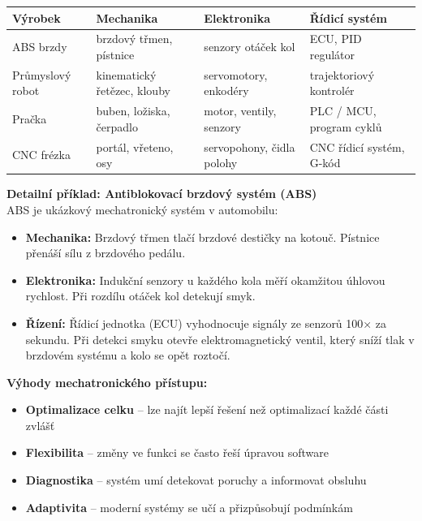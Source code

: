 \documentclass[a4paper,10pt]{article}
\begin{document}
\begin{vysvetlenibox}
\begin{center}
\begin{tabularx}{0.95\linewidth}{@{} l X X X @{}}
    \toprule
    \textbf{Výrobek} & \textbf{Mechanika} & \textbf{Elektronika}
                     & \textbf{Řídicí systém} \\
    \midrule
    ABS brzdy        & brzdový třmen, pístnice & senzory otáček kol
                     & ECU, PID regulátor \\
    Průmyslový robot & kinematický řetězec, klouby & servomotory, enkodéry
                     & trajektoriový kontrolér \\
    Pračka           & buben, ložiska, čerpadlo & motor, ventily, senzory
                     & PLC / MCU, program cyklů \\
    CNC frézka       & portál, vřeteno, osy & servopohony, čidla polohy
                     & CNC řídicí systém, G-kód \\
    \bottomrule
\end{tabularx}
\end{center}

\textbf{Detailní příklad: Antiblokovací brzdový systém (ABS)}\\
ABS je ukázkový mechatronický systém v automobilu:
\begin{itemize}[noitemsep, leftmargin=1.4em, topsep=4pt]
    \item \textbf{Mechanika:} Brzdový třmen tlačí brzdové destičky na kotouč.
          Pístnice přenáší sílu z brzdového pedálu.
    \item \textbf{Elektronika:} Indukční senzory u každého kola měří okamžitou
          úhlovou rychlost. Při rozdílu otáček kol detekují smyk.
    \item \textbf{Řízení:} Řídicí jednotka (ECU) vyhodnocuje signály ze senzorů
          100× za sekundu. Při detekci smyku otevře elektromagnetický ventil,
          který sníží tlak v brzdovém systému a kolo se opět roztočí.
\end{itemize}

\textbf{Výhody mechatronického přístupu:}
\begin{itemize}[noitemsep, leftmargin=1.4em, topsep=4pt]
    \item \textbf{Optimalizace celku} -- lze najít lepší řešení než optimalizací každé části zvlášť
    \item \textbf{Flexibilita} -- změny ve funkci se často řeší úpravou software
    \item \textbf{Diagnostika} -- systém umí detekovat poruchy a informovat obsluhu
    \item \textbf{Adaptivita} -- moderní systémy se učí a přizpůsobují podmínkám
\end{itemize}


\end{vysvetlenibox}
\end{document}
